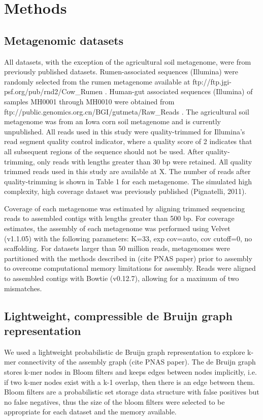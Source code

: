 \documentclass[11pt]{article} %
\begin{document}
\section{Methods}

\subsection{Metagenomic datasets}
All datasets, with the exception of the agricultural soil metagenome, were from previously published datasets. Rumen-associated sequences (Illumina) were randomly selected from the rumen metagenome available at ftp://ftp.jgi-psf.org/pub/rnd2/Cow\_Rumen \cite{Hess:2011p686}. Human-gut associated sequences (Illumina) of samples MH0001 through MH0010 were obtained from ftp://public.genomics.org.cn/BGI/gutmeta/Raw\_Reads \cite{Qin:2010p189}. The agricultural soil metagenome was from an Iowa corn soil metagenome and is currently unpublished. All reads used in this study were quality-trimmed for Illumina's read segment quality control indicator, where a quality score of 2 indicates that all subsequent regions of the sequence should not be used. After quality-trimming, only reads with lengths greater than 30 bp were retained. All quality trimmed reads used in this study are available at X.  The number of reads after quality-trimming is shown in Table 1 for each metagenome. The simulated high complexity, high coverage dataset was previously published (Pignatelli, 2011).  

Coverage of each metagenome was estimated by aligning trimmed sequencing reads to assembled contigs with lengths greater than 500 bp.  For coverage estimates, the assembly of each metagenome was performed using Velvet (v1.1.05) with the following parameters:  K=33, exp cov=auto, cov cutoff=0, no scaffolding.  For datasets larger than 50 million reads, metagenomes were partitioned with the methods described in (cite PNAS paper) prior to assembly to overcome computational memory limitations for assembly.  Reads were aligned to assembled contigs with Bowtie (v0.12.7), allowing for a maximum of two mismatches.  

\subsection{Lightweight, compressible de Bruijn graph representation}
We used a lightweight probabilistic de Bruijn graph representation to explore k-mer connectivity of the assembly graph (cite PNAS paper). The de Bruijn graph stores k-mer nodes in Bloom filters and keeps edges between nodes implicitly, i.e. if two k-mer nodes exist with a k-1 overlap, then there is an edge between them. Bloom filters are a probabilistic set storage data structure with false positives but no false negatives, thus the size of the bloom filters were selected to be appropriate for each dataset and the memory available.
	
\end{document}
